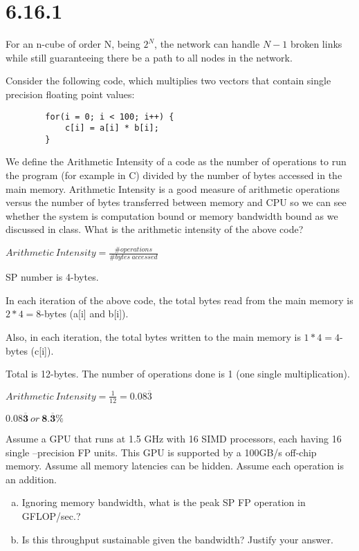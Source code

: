 	
	\part{6.16.1}
		For an n-cube of order N, being $2^{N}$, the network can handle $N-1$ broken links while still guaranteeing there be a path to all nodes in the network.
		
	

	Consider the following code, which multiplies two vectors that contain single precision floating point values:\par
	\begin{lstlisting}
		for(i = 0; i < 100; i++) {
			c[i] = a[i] * b[i];
		}
	\end{lstlisting}\par
	We define the Arithmetic Intensity of a code as the number of operations to run the program (for example in C) divided by the number of bytes accessed in the main memory. Arithmetic Intensity is a good measure of arithmetic operations versus the number of bytes transferred between memory and CPU so we can see whether the system is computation bound or memory bandwidth bound as we discussed in class. What is the arithmetic intensity of the above code?\par
	
	$Arithmetic\:Intensity=\frac{\#operations}{\#bytes\:accessed}$\par
	SP number is 4-bytes.\par
	In each iteration of the above code, the total bytes read from the main memory is $2*4=8$-bytes (a[i] and b[i]).\par
	Also, in each iteration, the total bytes written to the main memory is $1*4=4$-bytes (c[i]).\par
	Total is 12-bytes. The number of operations done is 1 (one single multiplication).\par
	$Arithmetic\:Intensity=\frac{1}{12}=0.08\overline{3}$\par
	$\boldsymbol{0.08\overline{3}}\:or\: \boldsymbol{8.\overline{3}\%}$
	
	

	
	Assume a GPU that runs at 1.5 GHz with 16 SIMD processors, each having 16 single –precision FP units. This GPU is supported by a 100GB/s off-chip memory. Assume all memory latencies can be hidden. Assume each operation is an addition.\par
	\begin{enumerate}[(a)]
		\item Ignoring memory bandwidth, what is the peak SP FP operation in GFLOP/sec.?
		\item Is this throughput sustainable given the bandwidth? Justify your answer.
	\end{enumerate}
	

